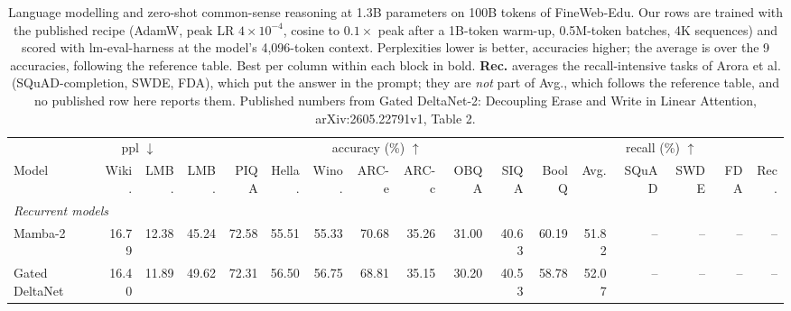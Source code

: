 \begin{table}[t]
  \centering
  \footnotesize
  \setlength{\tabcolsep}{3.5pt}
  \caption{Language modelling and zero-shot common-sense reasoning at 1.3B parameters on 100B tokens of FineWeb-Edu. Our rows are trained with the published recipe (AdamW, peak LR $4\times10^{-4}$, cosine to $0.1\times$ peak after a 1B-token warm-up, 0.5M-token batches, 4K sequences) and scored with lm-eval-harness at the model's 4{,}096-token context. Perplexities lower is better, accuracies higher; the average is over the 9 accuracies, following the reference table. Best per column within each block in bold. \textbf{Rec.} averages the recall-intensive tasks of Arora et al. (SQuAD-completion, SWDE, FDA), which put the answer in the prompt; they are \emph{not} part of Avg., which follows the reference table, and no published row here reports them. Published numbers from Gated DeltaNet-2: Decoupling Erase and Write in Linear Attention, arXiv:2605.22791v1, Table 2.}
  \label{tab:fwedu-1p3b-gdn2}
  \begin{tabular}{lrrrrrrrrrrrrrrrr}
    \toprule
    & \multicolumn{2}{c}{ppl $\downarrow$} & \multicolumn{9}{c}{accuracy (\%) $\uparrow$} & \multicolumn{4}{c}{recall (\%) $\uparrow$} \\
    \cmidrule(lr){2-3} \cmidrule(lr){4-12} \cmidrule(lr){13-13} \cmidrule(lr){14-17}
    Model & Wiki. & LMB. & LMB. & PIQA & Hella. & Wino. & ARC-e & ARC-c & OBQA & SIQA & BoolQ & Avg. & SQuAD & SWDE & FDA & Rec. \\
    \midrule
    \multicolumn{17}{l}{\textit{Recurrent models}} \\
    Mamba-2 & 16.79 & 12.38 & 45.24 & 72.58 & 55.51 & 55.33 & 70.68 & 35.26 & 31.00 & 40.63 & 60.19 & 51.82 & -- & -- & -- & -- \\
    Gated DeltaNet & 16.40 & 11.89 & 49.62 & 72.31 & 56.50 & 56.75 & 68.81 & 35.15 & 30.20 & 40.53 & 58.78 & 52.07 & -- & -- & -- & -- \\

\end{tabular}
\end{table}
